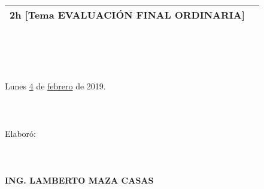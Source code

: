 \documentclass[landscape]{article}
\begin{document}
{\begin{center}
\begin{tabular}{|p{11cm}|p{8cm}|}
	2h	[Tema EVALUACI\'ON FINAL ORDINARIA]
&\\
\hline
\end{tabular}
\ \\
\ \\
\ \\
\ \\
Lunes \underline{\hspace{0.5cm}4\hspace{0.5cm}} de  \underline{\hspace{0.5cm}febrero\hspace{0.5cm}} de 2019.
\ \\
\ \\
\ \\
\ \\
Elabor\'o:
\ \\
\ \\
\ \\
\ \\
{\bf ING. LAMBERTO MAZA CASAS}
\end{center}
\eject
}
\end{document}
